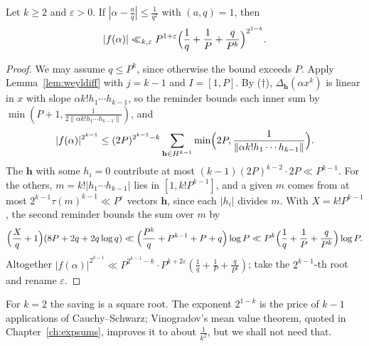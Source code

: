 \begin{theorem}\label{thm:weylk}
Let $k\ge2$ and $\varepsilon>0$. If $|\alpha-\frac aq|\le\frac1{q^2}$ with $(a,q)=1$, then
\[
|f(\alpha)|\ll_{k,\varepsilon}P^{1+\varepsilon}\Bigl(\frac1q+\frac1P+\frac q{P^k}\Bigr)^{2^{1-k}}.
\]
\end{theorem}
\begin{proof}
We may assume $q\le P^k$, since otherwise the bound exceeds $P$. Apply Lemma~\ref{lem:weyldiff} with $j=k-1$ and $I=[1,P]$. By ($\dagger$), $\Delta_{\mathbf h}(\alpha x^k)$ is linear in $x$ with slope $\alpha k!h_1\cdots h_{k-1}$, so the reminder bounds each inner sum by $\min(P+1,\frac1{2\|\alpha k!h_1\cdots h_{k-1}\|})$, and
\[
|f(\alpha)|^{2^{k-1}}\le(2P)^{2^{k-1}-k}\sum_{\mathbf h\in H^{k-1}}\min\Bigl(2P,\frac1{\|\alpha k!h_1\cdots h_{k-1}\|}\Bigr).
\]
The $\mathbf h$ with some $h_i=0$ contribute at most $(k-1)(2P)^{k-2}\cdot2P\ll P^{k-1}$. For the others, $m=k!|h_1\cdots h_{k-1}|$ lies in $[1,k!P^{k-1}]$, and a given $m$ comes from at most $2^{k-1}\tau(m)^{k-1}\ll P^\varepsilon$ vectors $\mathbf h$, since each $|h_i|$ divides $m$. With $X=k!P^{k-1}$, the second reminder bounds the sum over $m$ by
\[
\Bigl(\frac Xq+1\Bigr)(8P+2q+2q\log q)\ll\Bigl(\frac{P^k}q+P^{k-1}+P+q\Bigr)\log P\ll P^k\Bigl(\frac1q+\frac1P+\frac q{P^k}\Bigr)\log P.
\]
Altogether $|f(\alpha)|^{2^{k-1}}\ll P^{2^{k-1}-k}\cdot P^{k+2\varepsilon}(\frac1q+\frac1P+\frac q{P^k})$; take the $2^{k-1}$-th root and rename $\varepsilon$.
\end{proof}

For $k=2$ the saving is a square root. The exponent $2^{1-k}$ is the price of $k-1$ applications of Cauchy--Schwarz; Vinogradov's mean value theorem, quoted in Chapter~\ref{ch:expsums}, improves it to about $\frac1{k^2}$, but we shall not need that.


